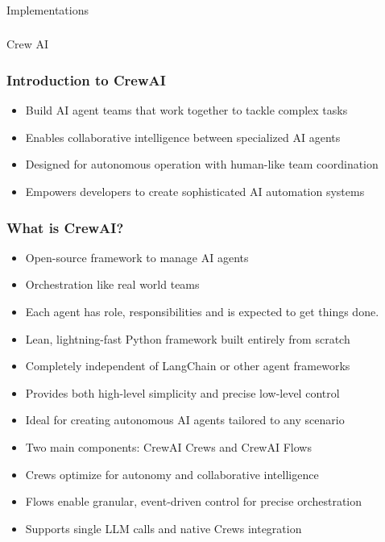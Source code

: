 \begin{frame}[fragile]\frametitle{}
\begin{center}
{\Large Implementations}
\end{center}
\end{frame}

\begin{frame}[fragile]\frametitle{}
\begin{center}
{\Large Crew AI}
\end{center}
\end{frame}

\begin{frame}[fragile]\frametitle{Introduction to CrewAI}
      \begin{itemize}
        \item Build AI agent teams that work together to tackle complex tasks
        \item Enables collaborative intelligence between specialized AI agents
        \item Designed for autonomous operation with human-like team coordination
        \item Empowers developers to create sophisticated AI automation systems
      \end{itemize}
\end{frame}

\begin{frame}[fragile]\frametitle{What is CrewAI?}
      \begin{itemize}
        \item Open-source framework to manage AI agents
		\item Orchestration like real world teams
		\item Each agent has role, responsibilities and is expected to get things done.
        \item Lean, lightning-fast Python framework built entirely from scratch
        \item Completely independent of LangChain or other agent frameworks
        \item Provides both high-level simplicity and precise low-level control
        \item Ideal for creating autonomous AI agents tailored to any scenario
        \item Two main components: CrewAI Crews and CrewAI Flows
        \item Crews optimize for autonomy and collaborative intelligence
        \item Flows enable granular, event-driven control for precise orchestration
        \item Supports single LLM calls and native Crews integration
      \end{itemize}
\end{frame}



